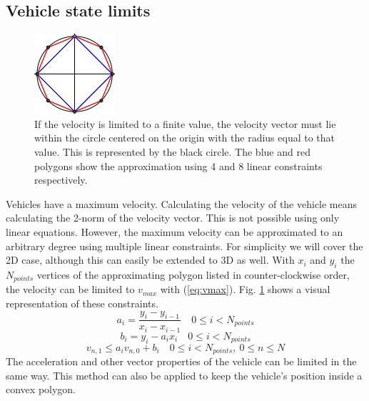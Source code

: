 \subsection{Vehicle state limits}
\begin{figure}
    \centering
        \includegraphics[width=0.33\columnwidth]{img/circlelinear2}
    \caption{If the velocity is limited to a finite value, the velocity vector must lie within the circle centered on the origin with the radius equal to that value. This is represented by the black circle. The blue and red polygons show the approximation using 4 and 8 linear constraints respectively.}\label{fig:circlelinear}
\end{figure}
Vehicles have a maximum velocity. Calculating the velocity of the vehicle means calculating the 2-norm of the velocity vector. This is not possible using only linear equations. However, the maximum velocity can be approximated to an arbitrary degree using multiple linear constraints. For simplicity we will cover the 2D case, although this can easily be extended to 3D as well. With $x_i$ and $y_i$ the $N_{points}$ vertices of the approximating polygon listed in counter-clockwise order, the velocity can be limited to $v_{max}$ with (\ref{eq:vmax}). Fig. \ref{fig:circlelinear} shows a visual representation of these constraints.
\begin{equation}
\label{eq:lin-a}
a_i = \dfrac{y_{i} - y_{i-1}}{x_{i} - x_{i-1}} \quad 0 \leq i < N_{points}
\end{equation}
\begin{equation}
\label{eq:lin-b}
b_i = y_{i} - a_i x_i  \quad 0 \leq i < N_{points}
\end{equation}
\begin{equation}
\label{eq:vmax}
v_{n, 1} \leq a_i v_{n,0} + b_i  \quad 0 \leq i < N_{points}, ~ 0 \leq n \leq N
\end{equation}
The acceleration and other vector properties of the vehicle can be limited in the same way. This method can also be applied to keep the vehicle's position inside a convex polygon.

